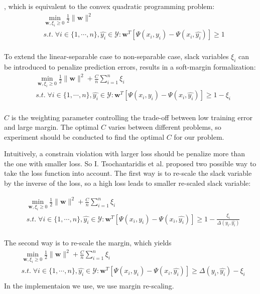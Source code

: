, which is equivalent to the convex quadratic programming problem:
$$
\begin{aligned}
   & \min_{\mathbf{w}, \xi_i \geq 0} \frac{1}{2}\|\mathbf{w}\|^2 \\\
    &s.t.\; \forall i \in \{1,\cdots,n\},\hat{y_i} \in \mathcal{Y}: \mathbf{w}^T[\Psi(x_i,y_i) - \Psi(x_i,\hat{y_i})] \geq 1\\
\end{aligned}
$$

To extend the linear-separable case to non-separable case, slack variables $\xi_i$ can be introduced to penalize prediction errors, results in a soft-margin formalization:
$$
\begin{aligned}
   & \min_{\mathbf{w}, \xi_i \geq 0} \frac{1}{2}\|\mathbf{w}\|^2 + \frac{C}{n}\sum^n_{i=1}\xi_i\\
    &s.t.\; \forall i \in \{1,\cdots,n\},\hat{y_i} \in \mathcal{Y}: \mathbf{w}^T[\Psi(x_i,y_i) - \Psi(x_i,\hat{y_i})] \geq 1 - \xi_i \\
\end{aligned}
$$

$C$ is the weighting parameter controlling the trade-off between low training error and large margin. The optimal $C$ varies between different problems, so experiment should be conducted to find the optimal $C$ for our problem.

Intuitively, a constrain violation with larger loss should be penalize more than the one with smaller loss. So I. Tsochantaridis et al. \cite{svm2005} proposed two possible way to take the loss function into account. The first way is to re-scale the slack variable by the inverse of the loss, so a high loss leads to smaller re-scaled slack variable:

$$
\begin{aligned}
   & \min_{\mathbf{w}, \xi_i \geq 0} \frac{1}{2}\|\mathbf{w}\|^2 + \frac{C}{n} \sum^n_{i=1}\xi_i\\
    &s.t.\; \forall i \in \{1,\cdots,n\},\hat{y_i} \in \mathcal{Y}: \mathbf{w}^T[\Psi(x_i,y_i) - \Psi(x_i,\hat{y_i})] \geq 1 - \frac{\xi_i}{\Delta(y_i, \hat{y_i})} \\
\end{aligned}
$$

The second way is to re-scale the margin, which yields 
$$
\begin{aligned}
   & \min_{\mathbf{w}, \xi_i \geq 0} \frac{1}{2}\|\mathbf{w}\|^2  + \frac{C}{n} \sum^n_{i=1}\xi_i\\
    &s.t.\; \forall i \in \{1,\cdots,n\},\hat{y_i} \in \mathcal{Y}: \mathbf{w}^T[\Psi(x_i,y_i) - \Psi(x_i,\hat{y_i})] \geq \Delta(y_i, \hat{y_i}) - \xi_i\\
%
\end{aligned}
$$
In the implementaion we use, we use margin re-scaling.

